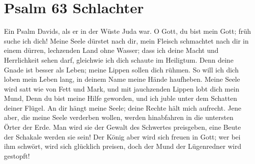 \documentclass[14pt]{mybib}
\author{Lothar Schmid}
\begin{document}
\setlength{\baselineskip}{2.5\baselineskip}

\section{Psalm 63 \small{Schlachter}}
Ein Psalm Davids, als er in der Wüste Juda war. O Gott, du bist mein Gott; früh suche ich dich! Meine Seele dürstet nach dir, mein Fleisch schmachtet nach dir in einem dürren, lechzenden Land ohne Wasser; dass ich deine Macht und Herrlichkeit sehen darf, gleichwie ich dich schaute im Heiligtum. Denn deine Gnade ist besser als Leben; meine Lippen sollen dich rühmen. So will ich dich loben mein Leben lang, in deinem Name meine Hände haufheben.  Meine Seele wird satt wie von Fett und Mark, und mit jauchzenden Lippen lobt dich mein Mund,  Denn du bist meine Hilfe geworden, und ich juble unter dem Schatten deiner Flügel. An dir hängt meine Seele; deine Rechte hält mich aufrecht.  Jene aber, die meine Seele verderben wollen, werden hinabfahren in die untersten Örter der Erde. Man wird sie der Gewalt des Schwertes preisgeben, eine Beute der Schakale werden sie sein! Der König aber wird sich freuen in Gott; wer bei ihm schwört, wird sich glücklich preisen, doch der Mund der Lügenredner wird gestopft!
\end{document}
